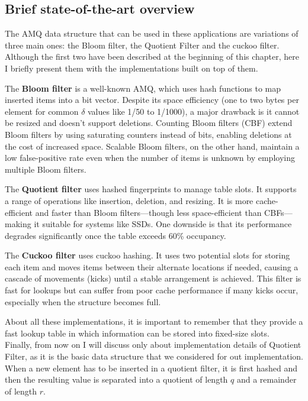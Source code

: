 \subsection{Brief state-of-the-art overview}
The AMQ data structure that can be used in these applications are variations of three main ones: the Bloom filter, the Quotient Filter and the cuckoo filter. Although the first two have been described at the beginning of this chapter, here I briefly present them with the implementations built on top of them.
\begin{definition}
	\item[The \textbf{Bloom filter}] is a well-known AMQ, which uses hash functions to map inserted items into a bit vector. Despite its space efficiency (one to two bytes per element for common $\delta$ values like 1/50 to 1/1000), a major drawback is it cannot be resized and doesn't support deletions. Counting Bloom filters (CBF) extend Bloom filters by using saturating counters instead of bits, enabling deletions at the cost of increased space. Scalable Bloom filters, on the other hand, maintain a low false-positive rate even when the number of items is unknown by employing multiple Bloom filters.
	\item[The \textbf{Quotient filter}] uses hashed fingerprints to manage table slots. It supports a range of operations like insertion, deletion, and resizing. It is more cache-efficient and faster than Bloom filters—though less space-efficient than CBFs—making it suitable for systems like SSDs. One downside is that its performance degrades significantly once the table exceeds 60\% occupancy.
	\item[The \textbf{Cuckoo filter}] uses cuckoo hashing. It uses two potential slots for storing each item and moves items between their alternate locations if needed, causing a cascade of movements (kicks) until a stable arrangement is achieved. This filter is fast for lookups but can suffer from poor cache performance if many kicks occur, especially when the structure becomes full.
\end{definition}
About all these implementations, it is important to remember that they provide a fast lookup table in which information can be stored into fixed-size slots.\\
Finally, from now on I will discuss only about implementation details of Quotient Filter, as it is the basic data structure that we considered for out implementation. When a new element has to be inserted in a quotient filter, it is first hashed and then the resulting value is separated into a quotient of length $q$ and a remainder of length $r$.
